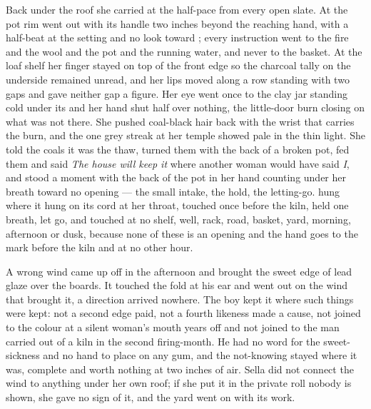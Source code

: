 Back under the roof she carried at the half-pace from every open slate. At  the pot rim went out with its handle two inches beyond the reaching hand, with a half-beat at the setting and no look toward ; every instruction went to the fire and the wool and the pot and the running water, and never to the basket. At the loaf shelf her finger stayed on top of the front edge so the charcoal tally on the underside remained unread, and her lips moved along a row standing with two gaps and gave neither gap a figure. Her eye went once to the clay jar standing cold under its  and her hand shut half over nothing, the little-door burn closing on what was not there. She pushed coal-black hair back with the wrist that carries the burn, and the one grey streak at her temple showed pale in the thin light. She told the coals it was the thaw, turned them with the back of a broken pot, fed them and said \emph{The house will keep it} where another woman would have said \emph{I}, and stood a moment with the back of the pot in her hand counting under her breath toward no opening --- the small intake, the hold, the letting-go.  hung where it hung on its cord at her throat, touched once before the kiln, held one breath, let go, and touched at no shelf, well, rack, road, basket, yard, morning, afternoon or dusk, because none of these is an opening and the hand goes to the mark before the kiln and at no other hour.

A wrong wind came up off  in the afternoon and brought the sweet edge of lead glaze over the boards. It touched the fold at his ear and went out on the wind that brought it, a direction arrived nowhere. The boy kept it where such things were kept: not a second edge paid, not a fourth likeness made a cause, not joined to the colour at a silent woman's mouth years off and not joined to the man carried out of a kiln in the second firing-month. He had no  word for the sweet-sickness and no hand to place on any gum, and the not-knowing stayed where it was, complete and worth nothing at two inches of air. Sella did not connect the wind to anything under her own roof; if she put it in the private roll nobody is shown, she gave no sign of it, and the yard went on with its work.

\scenebreak

